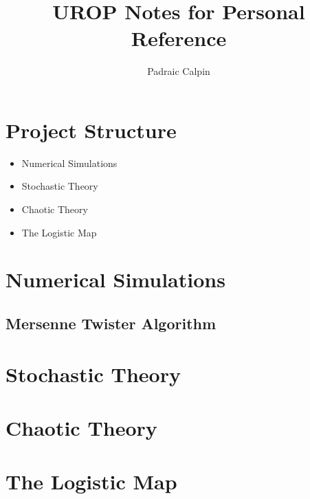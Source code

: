 \documentclass{article}
\begin{document}
\title{UROP Notes for Personal Reference}
\author{Padraic Calpin}
\maketitle

\section*{Project Structure}
\begin{itemize}
	\item Numerical Simulations
	\item Stochastic Theory
	\item Chaotic Theory
	\item The Logistic Map
\end{itemize}
\section*{Numerical Simulations}
\subsection*{Mersenne Twister Algorithm}

\section*{Stochastic Theory}
\section*{Chaotic Theory}
\section*{The Logistic Map}
\end{document}

